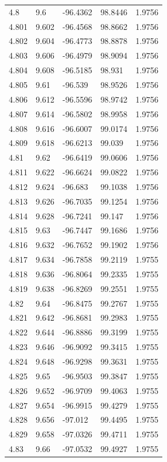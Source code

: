 \begin{tabular}{lllll}
4.8 & 9.6 & -96.4362 & 98.8446 & 1.9756 \\
4.801 & 9.602 & -96.4568 & 98.8662 & 1.9756 \\
4.802 & 9.604 & -96.4773 & 98.8878 & 1.9756 \\
4.803 & 9.606 & -96.4979 & 98.9094 & 1.9756 \\
4.804 & 9.608 & -96.5185 & 98.931 & 1.9756 \\
4.805 & 9.61 & -96.539 & 98.9526 & 1.9756 \\
4.806 & 9.612 & -96.5596 & 98.9742 & 1.9756 \\
4.807 & 9.614 & -96.5802 & 98.9958 & 1.9756 \\
4.808 & 9.616 & -96.6007 & 99.0174 & 1.9756 \\
4.809 & 9.618 & -96.6213 & 99.039 & 1.9756 \\
4.81 & 9.62 & -96.6419 & 99.0606 & 1.9756 \\
4.811 & 9.622 & -96.6624 & 99.0822 & 1.9756 \\
4.812 & 9.624 & -96.683 & 99.1038 & 1.9756 \\
4.813 & 9.626 & -96.7035 & 99.1254 & 1.9756 \\
4.814 & 9.628 & -96.7241 & 99.147 & 1.9756 \\
4.815 & 9.63 & -96.7447 & 99.1686 & 1.9756 \\
4.816 & 9.632 & -96.7652 & 99.1902 & 1.9756 \\
4.817 & 9.634 & -96.7858 & 99.2119 & 1.9755 \\
4.818 & 9.636 & -96.8064 & 99.2335 & 1.9755 \\
4.819 & 9.638 & -96.8269 & 99.2551 & 1.9755 \\
4.82 & 9.64 & -96.8475 & 99.2767 & 1.9755 \\
4.821 & 9.642 & -96.8681 & 99.2983 & 1.9755 \\
4.822 & 9.644 & -96.8886 & 99.3199 & 1.9755 \\
4.823 & 9.646 & -96.9092 & 99.3415 & 1.9755 \\
4.824 & 9.648 & -96.9298 & 99.3631 & 1.9755 \\
4.825 & 9.65 & -96.9503 & 99.3847 & 1.9755 \\
4.826 & 9.652 & -96.9709 & 99.4063 & 1.9755 \\
4.827 & 9.654 & -96.9915 & 99.4279 & 1.9755 \\
4.828 & 9.656 & -97.012 & 99.4495 & 1.9755 \\
4.829 & 9.658 & -97.0326 & 99.4711 & 1.9755 \\
4.83 & 9.66 & -97.0532 & 99.4927 & 1.9755 \\

\end{tabular}
